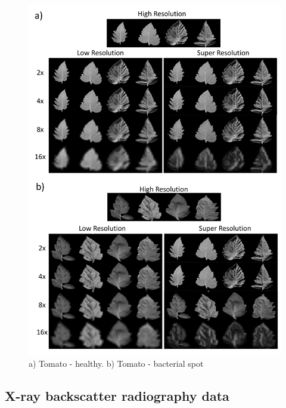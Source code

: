 \documentclass[10pt,twocolumn,letterpaper]{article}
\begin{document}
\begin{figure}[h]
\begin{center}
\includegraphics[scale=0.40]{results/srimages.pdf}
\end{center}
   \caption{a) Tomato - healthy. b) Tomato - bacterial spot} 
\label{fig:srimages}
\end{figure}

\subsection{X-ray backscatter radiography data}
\end{document}
